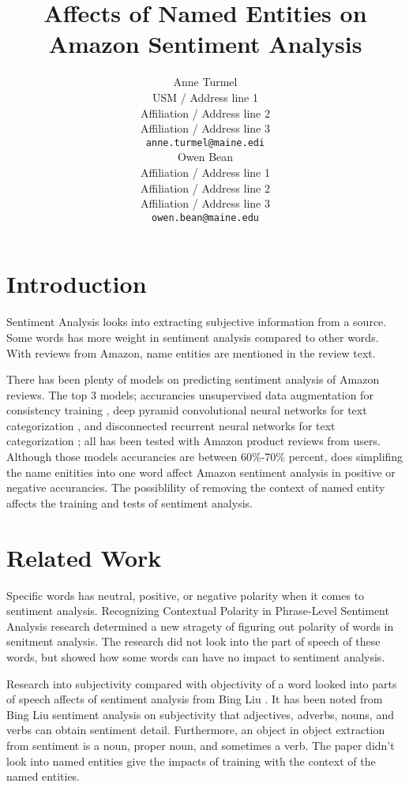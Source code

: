 \documentclass[11pt,a4paper]{article}
\title{Affects of Named Entities on Amazon Sentiment Analysis}
\author{Anne Turmel \\
  USM / Address line 1 \\
  Affiliation / Address line 2 \\
  Affiliation / Address line 3 \\
  \texttt{anne.turmel@maine.edi} \\\And
  Owen Bean \\
  Affiliation / Address line 1 \\
  Affiliation / Address line 2 \\
  Affiliation / Address line 3 \\
  \texttt{owen.bean@maine.edu} \\}
\date{}
\begin{document}
\maketitle
\begin{abstract}
\end{abstract}

\section{Introduction}


Sentiment Analysis looks into extracting subjective information from a source. Some words has more weight in sentiment analysis compared to other words. With reviews from Amazon, name entities are mentioned in the review text. 

There has been plenty of models on predicting sentiment analysis of Amazon reviews. The top 3 models; accurancies unsupervised data augmentation for consistency training \cite{unsupervised}, deep pyramid convolutional neural networks for text categorization \cite{pyramid}, and disconnected recurrent neural networks for text categorization \cite{disconnect}; all has been tested with Amazon product reviews from users. Although those models accurancies are between 60\%-70\% percent, does simplifing the name enitities into one word affect Amazon sentiment analysis in positive or negative accurancies. The possiblility of removing the context of named entity affects the training and tests of sentiment analysis.

\section{Related Work}

Specific words has neutral, positive, or negative polarity when it comes to sentiment analysis. Recognizing Contextual Polarity in Phrase-Level Sentiment Analysis research determined a new stragety of figuring out polarity of words in senitment analysis. The research did not look into the part of speech of these words, but showed how some words can have no impact to sentiment analysis. 

Research into subjectivity compared with objectivity of a word looked into parts of speech affects of sentiment analysis from Bing Liu \cite{subject}. It has been noted from Bing Liu sentiment analysis on subjectivity that adjectives, adverbs, nouns, and verbs can obtain sentiment detail. Furthermore, an object in object extraction from sentiment is a noun, proper noun, and sometimes a verb. The paper didn't look into named entities give the impacts of training with the context of the named entities.
\end{document}
